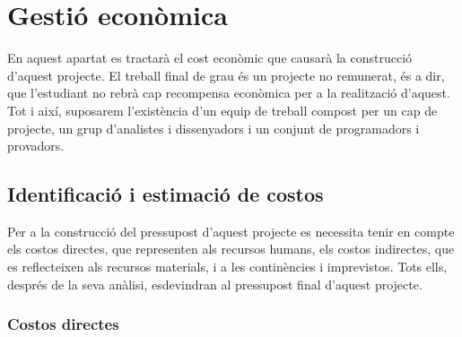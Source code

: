 
\chapter{Gestió econòmica} %

\label{Chapter10} %

En aquest apartat es tractarà el cost econòmic que causarà la construcció d’aquest projecte. El treball final de grau és un projecte no remunerat, és a dir, que l’estudiant no rebrà cap recompensa econòmica per a la realització d’aquest. Tot i així, suposarem l’existència d’un equip de treball compost per un cap de projecte, un grup d’analistes i dissenyadors i un conjunt de programadors i provadors.


\section{Identificació i estimació de costos}

Per a la construcció del pressupost\cite{presupuesto} d’aquest projecte es necessita tenir en compte els costos directes, que representen als recursos humans, els costos indirectes, que es reflecteixen als recursos materials, i a les continències i imprevistos. Tots ells, després de la seva anàlisi, esdevindran al pressupost final d’aquest projecte.

\subsection{Costos directes}

